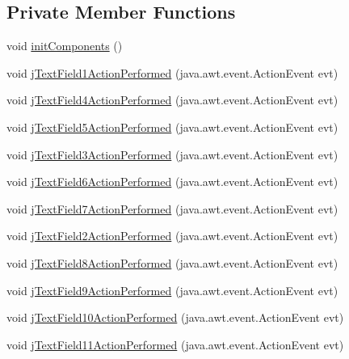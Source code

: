 \subsection*{Private Member Functions}
\begin{DoxyCompactItemize}
\item 
void \mbox{\hyperlink{classsoftware_1_1parasoftware3_a0078db114d1f74f8ea2f26196562da61}{init\+Components}} ()
\item 
void \mbox{\hyperlink{classsoftware_1_1parasoftware3_a0cfede9cef6efbcec21f11c242a315c6}{j\+Text\+Field1\+Action\+Performed}} (java.\+awt.\+event.\+Action\+Event evt)
\item 
void \mbox{\hyperlink{classsoftware_1_1parasoftware3_a7cb85bd10b5032e0558802540683510f}{j\+Text\+Field4\+Action\+Performed}} (java.\+awt.\+event.\+Action\+Event evt)
\item 
void \mbox{\hyperlink{classsoftware_1_1parasoftware3_a097c2aa02dfa066c6041878ef8ba4e8c}{j\+Text\+Field5\+Action\+Performed}} (java.\+awt.\+event.\+Action\+Event evt)
\item 
void \mbox{\hyperlink{classsoftware_1_1parasoftware3_a2332853b1533b03c93fb6af67852c214}{j\+Text\+Field3\+Action\+Performed}} (java.\+awt.\+event.\+Action\+Event evt)
\item 
void \mbox{\hyperlink{classsoftware_1_1parasoftware3_a146926b0a1a316565b96a3e6d35ad5f9}{j\+Text\+Field6\+Action\+Performed}} (java.\+awt.\+event.\+Action\+Event evt)
\item 
void \mbox{\hyperlink{classsoftware_1_1parasoftware3_ada917140604cb8cf60b114f8777da195}{j\+Text\+Field7\+Action\+Performed}} (java.\+awt.\+event.\+Action\+Event evt)
\item 
void \mbox{\hyperlink{classsoftware_1_1parasoftware3_a2ff1159c69e5fefd7c2582b2e14db77a}{j\+Text\+Field2\+Action\+Performed}} (java.\+awt.\+event.\+Action\+Event evt)
\item 
void \mbox{\hyperlink{classsoftware_1_1parasoftware3_aef5f7c5d92a7d6c58dfc8ce2fd80da01}{j\+Text\+Field8\+Action\+Performed}} (java.\+awt.\+event.\+Action\+Event evt)
\item 
void \mbox{\hyperlink{classsoftware_1_1parasoftware3_a40195e49c216f9f4f41678240d0ffc1a}{j\+Text\+Field9\+Action\+Performed}} (java.\+awt.\+event.\+Action\+Event evt)
\item 
void \mbox{\hyperlink{classsoftware_1_1parasoftware3_a457010d249cc595838f8cd5a65a94a0a}{j\+Text\+Field10\+Action\+Performed}} (java.\+awt.\+event.\+Action\+Event evt)
\item 
void \mbox{\hyperlink{classsoftware_1_1parasoftware3_a761e7d64ea660c9877635a7951cb801e}{j\+Text\+Field11\+Action\+Performed}} (java.\+awt.\+event.\+Action\+Event evt)
\end{DoxyCompactItemize}
